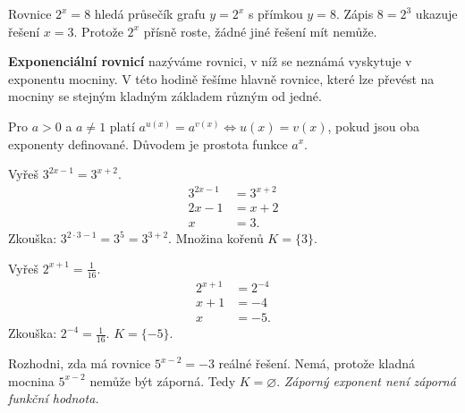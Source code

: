 \documentclass[11pt,a4paper]{article}
\begin{document}
Rovnice $2^x=8$ hledá průsečík grafu $y=2^x$ s přímkou $y=8$. Zápis $8=2^3$ ukazuje řešení $x=3$. Protože $2^x$ přísně roste, žádné jiné řešení mít nemůže.
\begin{definiceBox}[title={Definice - Exponenciální rovnice}]
\textbf{Exponenciální rovnicí} nazýváme rovnici, v níž se neznámá vyskytuje v exponentu mocniny. V této hodině řešíme hlavně rovnice, které lze převést na mocniny se stejným kladným základem různým od jedné.
\end{definiceBox}
\begin{zadaniBox}[title={Věta - Rovnost mocnin stejného základu}]
Pro $a>0$ a $a\ne1$ platí $a^{u(x)}=a^{v(x)}\iff u(x)=v(x)$, pokud jsou oba exponenty definované. Důvodem je prostota funkce $a^x$.
\end{zadaniBox}
\begin{prikladReseniBox}[title={Příklad 1}]
Vyřeš $3^{2x-1}=3^{x+2}$.
\tcblower
\[\begin{aligned}3^{2x-1}&=3^{x+2}\\2x-1&=x+2\\x&=3.\end{aligned}\]
Zkouška: $3^{2\cdot3-1}=3^5=3^{3+2}$. Množina kořenů $K=\{3\}$.
\end{prikladReseniBox}
\begin{prikladReseniBox}[title={Příklad 2}]
Vyřeš $2^{x+1}=\frac{1}{16}$.
\tcblower
\[\begin{aligned}2^{x+1}&=2^{-4}\\x+1&=-4\\x&=-5.\end{aligned}\]
Zkouška: $2^{-4}=\frac{1}{16}$. $K=\{-5\}$.
\end{prikladReseniBox}
\begin{prikladReseniBox}[title={Příklad 3}]
Rozhodni, zda má rovnice $5^{x-2}=-3$ reálné řešení.
\tcblower
Nemá, protože kladná mocnina $5^{x-2}$ nemůže být záporná. Tedy $K=\varnothing$. \emph{Záporný exponent není záporná funkční hodnota.}
\end{prikladReseniBox}
\end{document}
